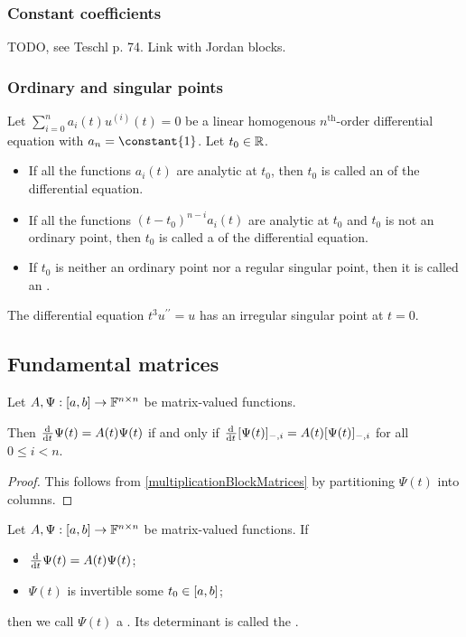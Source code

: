 \subsubsection{Constant coefficients}
TODO, see Teschl p. 74. Link with Jordan blocks.

\subsubsection{Ordinary and singular points}
\begin{definition}
Let $\sum_{i=0}^n a_i(t)u^{(i)}(t) = 0$ be a linear homogenous $n^\text{th}$-order differential equation with $a_n = \constant{1}$. Let $t_0\in \mathbb{R}$.
\begin{itemize}
\item If all the functions $a_i(t)$ are analytic at $t_0$, then $t_0$ is called an  of the differential equation.
\item If all the functions $(t-t_0)^{n-i}a_i(t)$ are analytic at $t_0$ and $t_0$ is not an ordinary point, then $t_0$ is called a  of the differential equation.
\item If $t_0$ is neither an ordinary point nor a regular singular point, then it is called an .
\end{itemize}
\end{definition}

\begin{example}
The differential equation $t^3u^{\prime\prime} = u$ has an irregular singular point at $t=0$.
\end{example}

\subsection{Fundamental matrices}
\begin{lemma}
Let $A, \Psi: \interval{a,b}\to \F^{n\times n}$ be matrix-valued functions.

Then $\od{}{t}\Psi(t) = A(t)\Psi(t)$ \textup{if and only if} $\od{}{t}[\Psi(t)]_{-,i} = A(t)[\Psi(t)]_{-,i}$ for all $0\leq i< n$.
\end{lemma}
\begin{proof}
This follows from \ref{multiplicationBlockMatrices} by partitioning $\Psi(t)$ into columns.
\end{proof}

\begin{definition}
Let $A, \Psi: \interval{a,b}\to \F^{n\times n}$ be matrix-valued functions. If
\begin{itemize}
\item $\od{}{t}\Psi(t) = A(t)\Psi(t)$;
\item $\Psi(t)$ is invertible some $t_0\in \interval{a,b}$;
\end{itemize}
then we call $\Psi(t)$ a . Its determinant is called the .
\end{definition}

